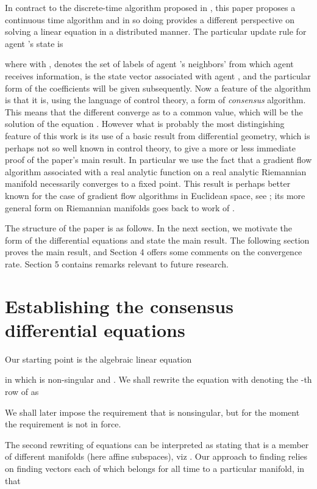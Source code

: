 \documentclass{aims}
\begin{document}
In contract to the discrete-time algorithm proposed in \cite{SJA14TAC}, this paper proposes a continuous time algorithm and in so doing provides a different perspective on solving a linear equation in a distributed manner.
  The particular update rule for agent 's state is

where with ,  denotes the set of labels of agent 's neighbors' from which agent  receives information,  is the state vector associated with agent , and the particular form of the coefficients  will be given subsequently. Now a feature of the algorithm is that it is, using the language of control theory, a form of {\it{consensus}} algorithm. This means that the different  converge as  to a common value, which will be the solution of the equation . However what is probably the most distingishing feature of this work is its use of a  basic  result  from differential geometry,   which is perhaps not so well known  in control theory, to give a more or less immediate proof  of the paper's main result. In particular we use the fact that a gradient flow algorithm associated with a real analytic function on a real analytic Riemannian
manifold  necessarily converges to a fixed point. This result is
perhaps better known for the case of gradient flow algorithms in Euclidean space, see \cite{Lojasie84};
its more general form on Riemannian manifolds goes back to work of \cite{KTA00Math}.

The structure of the paper is as follows. In the next section, we motivate the form of the differential equations and state the main result.   The following section proves the main result, and Section 4 offers some comments on the convergence rate. Section 5 contains remarks relevant to future research.







\section{Establishing the consensus differential equations}

Our starting point is the algebraic linear equation

in which  is non-singular and . We shall rewrite the equation with  denoting the -th row of  as

 We shall later impose the requirement that  is nonsingular, but for the moment the requirement is not in force.

The second rewriting of equations can be interpreted as stating that  is a member of  different manifolds (here affine subspaces), viz .  Our approach to finding  relies on finding  vectors  each of which belongs for all time to a particular manifold, in that
\end{document}
